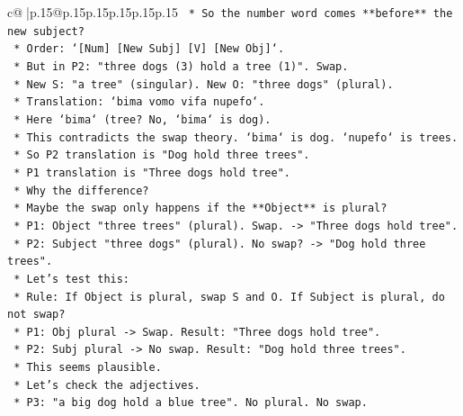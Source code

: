 \documentclass{article}
\begin{document}
{\begin{supertabular}{c@{$\;$}|p{.15\linewidth}@{}p{.15\linewidth}p{.15\linewidth}p{.15\linewidth}p{.15\linewidth}p{.15\linewidth}}
{{{\texttt{                        *   So the number word comes **before** the new subject?} \\
\texttt{                        *   Order: `{[}Num{]} {[}New Subj{]} {[}V{]} {[}New Obj{]}`.} \\
\texttt{                        *   But in P2: "three dogs (3) hold a tree (1)". Swap.} \\
\texttt{                        *   New S: "a tree" (singular). New O: "three dogs" (plural).} \\
\texttt{                        *   Translation: `bima vomo vifa nupefo`.} \\
\texttt{                        *   Here `bima` (tree? No, `bima` is dog).} \\
\texttt{                        *   This contradicts the swap theory. `bima` is dog. `nupefo` is trees.} \\
\texttt{                        *   So P2 translation is "Dog hold three trees".} \\
\texttt{                        *   P1 translation is "Three dogs hold tree".} \\
\texttt{                        *   Why the difference?} \\
\texttt{                        *   Maybe the swap only happens if the **Object** is plural?} \\
\texttt{                        *   P1: Object "three trees" (plural). Swap. {-}> "Three dogs hold tree".} \\
\texttt{                        *   P2: Subject "three dogs" (plural). No swap? {-}> "Dog hold three trees".} \\
\texttt{                        *   Let's test this:} \\
\texttt{                            *   Rule: If Object is plural, swap S and O. If Subject is plural, do not swap?} \\
\texttt{                            *   P1: Obj plural {-}> Swap. Result: "Three dogs hold tree".} \\
\texttt{                            *   P2: Subj plural {-}> No swap. Result: "Dog hold three trees".} \\
\texttt{                            *   This seems plausible.} \\
\texttt{                            *   Let's check the adjectives.} \\
\texttt{                            *   P3: "a big dog hold a blue tree". No plural. No swap.} \\
}}}
\end{supertabular}}
\end{document}
